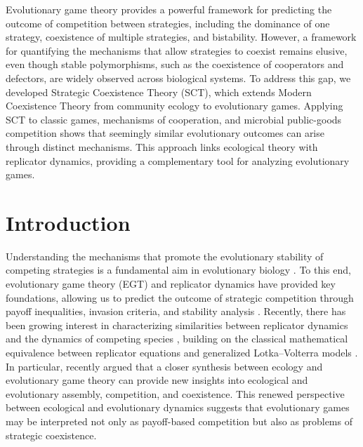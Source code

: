 \documentclass[12pt]{article}
\begin{document}
Evolutionary game theory provides a powerful framework for predicting the outcome of competition between strategies, including the dominance of one strategy, coexistence of multiple strategies, and bistability.
However, a framework for quantifying the mechanisms that allow strategies to coexist remains elusive, even though stable polymorphisms, such as the coexistence of cooperators and defectors, are widely observed across biological systems.
To address this gap, we developed Strategic Coexistence Theory (SCT), which extends Modern Coexistence Theory from community ecology to evolutionary games.
Applying SCT to classic games, mechanisms of cooperation, and microbial public-goods competition shows that seemingly similar evolutionary outcomes can arise through distinct mechanisms.
This approach links ecological theory with replicator dynamics, providing a complementary tool for analyzing evolutionary games.

\section*{Introduction}

Understanding the mechanisms that promote the evolutionary stability of competing strategies is a fundamental aim in evolutionary biology \citep{lewontin1961evolution,slobodkin1964strategy,smith1973logic,taylor1978evolutionary}.
To this end, evolutionary game theory (EGT) and replicator dynamics have provided key foundations, allowing us to predict the outcome of strategic competition through payoff inequalities, invasion criteria, and stability analysis \citep{schuster1983replicator,hofbauer1998evolutionary,cressman2003evolutionary,cressman2014replicator}.
Recently, there has been growing interest in characterizing similarities between replicator dynamics and the dynamics of competing species \citep{gokhale2025higher,tarnita2025reconciling,allesina2026global}, building on the classical mathematical equivalence between replicator equations and generalized Lotka–Volterra models \citep{hofbauer1981occurrence,page2002unifying}.
In particular, \cite{tarnita2025reconciling} recently argued that a closer synthesis between ecology and evolutionary game theory can provide new insights into ecological and evolutionary assembly, competition, and coexistence.
This renewed perspective between ecological and evolutionary dynamics suggests that evolutionary games may be interpreted not only as payoff-based competition but also as problems of strategic coexistence.
\end{document}
